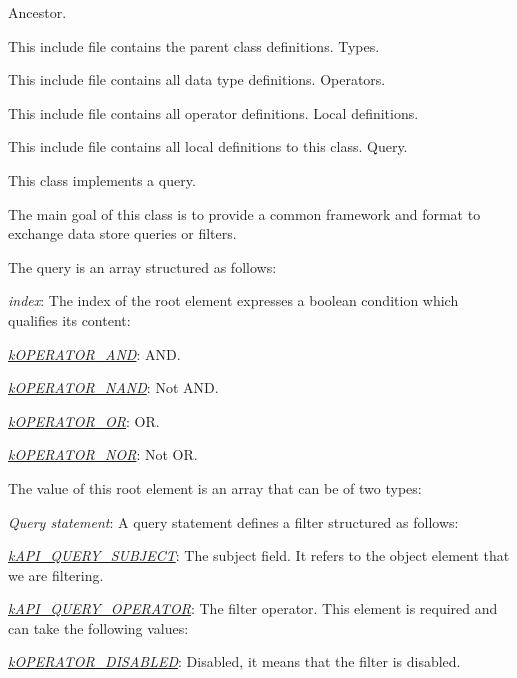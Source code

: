 Ancestor.

This include file contains the parent class definitions. Types.

This include file contains all data type definitions. Operators.

This include file contains all operator definitions. Local definitions.

This include file contains all local definitions to this class. Query.

This class implements a query.

The main goal of this class is to provide a common framework and format to exchange data store queries or filters.

The query is an array structured as follows\-:


\begin{DoxyItemize}
\item {\itshape index}\-: The index of the root element expresses a boolean condition which qualifies its content\-: 
\begin{DoxyItemize}
\item {\itshape \hyperlink{}{k\-O\-P\-E\-R\-A\-T\-O\-R\-\_\-\-A\-N\-D}}\-: A\-N\-D. 
\item {\itshape \hyperlink{}{k\-O\-P\-E\-R\-A\-T\-O\-R\-\_\-\-N\-A\-N\-D}}\-: Not A\-N\-D. 
\item {\itshape \hyperlink{}{k\-O\-P\-E\-R\-A\-T\-O\-R\-\_\-\-O\-R}}\-: O\-R. 
\item {\itshape \hyperlink{}{k\-O\-P\-E\-R\-A\-T\-O\-R\-\_\-\-N\-O\-R}}\-: Not O\-R. 
\end{DoxyItemize}The value of this root element is an array that can be of two types\-: 
\begin{DoxyItemize}
\item {\itshape Query statement}\-: A query statement defines a filter structured as follows\-: 
\begin{DoxyItemize}
\item {\itshape \hyperlink{}{k\-A\-P\-I\-\_\-\-Q\-U\-E\-R\-Y\-\_\-\-S\-U\-B\-J\-E\-C\-T}}\-: The subject field. It refers to the object element that we are filtering. 
\item {\itshape \hyperlink{}{k\-A\-P\-I\-\_\-\-Q\-U\-E\-R\-Y\-\_\-\-O\-P\-E\-R\-A\-T\-O\-R}}\-: The filter operator. This element is required and can take the following values\-: 
\begin{DoxyItemize}
\item {\itshape \hyperlink{}{k\-O\-P\-E\-R\-A\-T\-O\-R\-\_\-\-D\-I\-S\-A\-B\-L\-E\-D}}\-: Disabled, it means that the filter is disabled. 

\end{DoxyItemize}
\end{DoxyItemize}
\end{DoxyItemize}
\end{DoxyItemize}
